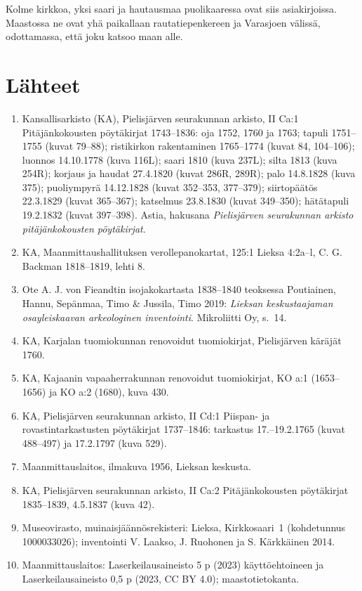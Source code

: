 \documentclass[11pt,a4paper]{article}
\begin{document}
Kolme kirkkoa, yksi saari ja hautausmaa puolikaaressa ovat siis asiakirjoissa. Maastossa ne ovat yhä paikallaan rautatiepenkereen ja Varasjoen välissä, odottamassa, että joku katsoo maan alle.

\section{Lähteet}
{\small
\begin{enumerate}[label={\color{leima}\sffamily\arabic*},leftmargin=18pt,itemsep=2pt,parsep=0pt]
\item Kansallisarkisto (KA), Pielisjärven seurakunnan arkisto, II Ca:1 Pitäjänkokousten pöytäkirjat 1743--1836: oja 1752, 1760 ja 1763; tapuli 1751--1755 (kuvat 79--88); ristikirkon rakentaminen 1765--1774 (kuvat 84, 104--106); luonnos 14.10.1778 (kuva 116L); saari 1810 (kuva 237L); silta 1813 (kuva 254R); korjaus ja haudat 27.4.1820 (kuvat 286R, 289R); palo 14.8.1828 (kuva 375); puoliympyrä 14.12.1828 (kuvat 352--353, 377--379); siirtopäätös 22.3.1829 (kuvat 365--367); katselmus 23.8.1830 (kuvat 349--350); hätätapuli 19.2.1832 (kuvat 397--398). Astia, hakusana \textit{Pielisjärven seurakunnan arkisto pitäjänkokousten pöytäkirjat}.
\item KA, Maanmittaushallituksen verollepanokartat, 125:1 Lieksa 4:2a--l, C. G. Backman 1818--1819, lehti 8.
\item Ote A. J. von Fieandtin isojakokartasta 1838--1840 teoksessa Poutiainen, Hannu, Sepänmaa, Timo \& Jussila, Timo 2019: \textit{Lieksan keskustaajaman osayleiskaavan arkeologinen inventointi}. Mikroliitti Oy, s.~14.
\item KA, Karjalan tuomiokunnan renovoidut tuomiokirjat, Pielisjärven käräjät 1760.
\item KA, Kajaanin vapaaherrakunnan renovoidut tuomiokirjat, KO a:1 (1653--1656) ja KO a:2 (1680), kuva 430.
\item KA, Pielisjärven seurakunnan arkisto, II Cd:1 Piispan- ja rovastintarkastusten pöytäkirjat 1737--1846: tarkastus 17.--19.2.1765 (kuvat 488--497) ja 17.2.1797 (kuva 529).
\item Maanmittauslaitos, ilmakuva 1956, Lieksan keskusta.
\item KA, Pielisjärven seurakunnan arkisto, II Ca:2 Pitäjänkokousten pöytäkirjat 1835--1839, 4.5.1837 (kuva 42).
\item Museovirasto, muinaisjäännösrekisteri: Lieksa, Kirkkosaari~1 (kohdetunnus 1000033026); inventointi V. Laakso, J. Ruohonen ja S. Kärkkäinen 2014.
\item Maanmittauslaitos: Laserkeilausaineisto 5 p (2023) käyttöehtoineen ja Laserkeilausaineisto 0,5 p (2023, CC BY 4.0); maastotietokanta.
\end{enumerate}
}
\end{document}

